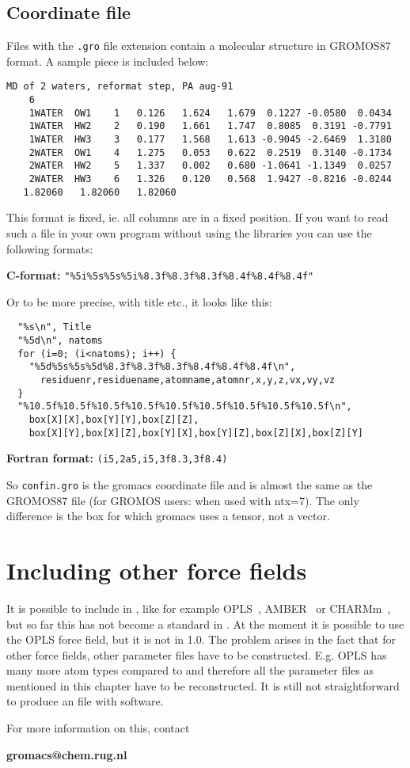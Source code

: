 \subsection{Coordinate file}
\label{subsec:grofile}
Files with the {\tt .gro} file extension contain a molecular structure in 
GROMOS87 format. A sample piece is included below:
{\small\begin{verbatim}
MD of 2 waters, reformat step, PA aug-91
    6
    1WATER  OW1    1   0.126   1.624   1.679  0.1227 -0.0580  0.0434
    1WATER  HW2    2   0.190   1.661   1.747  0.8085  0.3191 -0.7791
    1WATER  HW3    3   0.177   1.568   1.613 -0.9045 -2.6469  1.3180
    2WATER  OW1    4   1.275   0.053   0.622  0.2519  0.3140 -0.1734
    2WATER  HW2    5   1.337   0.002   0.680 -1.0641 -1.1349  0.0257
    2WATER  HW3    6   1.326   0.120   0.568  1.9427 -0.8216 -0.0244
   1.82060   1.82060   1.82060
\end{verbatim}}
This format is fixed, ie. all columns are in a fixed position. If you
want to read such a file in your own program without using the
{\gromacs} libraries you can use the following formats:

{\bf C-format:} \verb'"%5i%5s%5s%5i%8.3f%8.3f%8.3f%8.4f%8.4f%8.4f"'

Or to be more precise, with title etc., it looks like this:
\begin{verbatim}
  "%s\n", Title
  "%5d\n", natoms
  for (i=0; (i<natoms); i++) {
    "%5d%5s%5s%5d%8.3f%8.3f%8.3f%8.4f%8.4f%8.4f\n",
      residuenr,residuename,atomname,atomnr,x,y,z,vx,vy,vz
  }
  "%10.5f%10.5f%10.5f%10.5f%10.5f%10.5f%10.5f%10.5f%10.5f\n",
    box[X][X],box[Y][Y],box[Z][Z],
    box[X][Y],box[X][Z],box[Y][X],box[Y][Z],box[Z][X],box[Z][Y]
\end{verbatim}

{\bf Fortran format:} \verb'(i5,2a5,i5,3f8.3,3f8.4)'

So \verb'confin.gro' is the gromacs coordinate file and is almost the
same as the GROMOS87 file (for GROMOS users: when used with
ntx=7). The only difference is the box for which gromacs uses a
tensor, not a vector.

\section{Including other force fields}
\label{sec:otherff}
It is possible to include  
in {\gromacs}, like for
example OPLS~\cite{Jorgensen88}, AMBER~\cite{Weiner86} or 
CHARMm~\cite{BBrooks83},
but so far this has not become a standard in {\gromacs}. At the moment
it is possible to use the OPLS force field, but it is not in {\gromacs}
1.0. The problem arises in the fact that for other force fields, other
parameter files have to be constructed. E.g. OPLS has many more atom
types compared to {\gromacs} and therefore all the parameter files as
mentioned in this chapter have to be reconstructed. It is still not
straightforward to produce an  file with {\gromacs}
software. 

For more information on this, contact

{\bf gromacs@chem.rug.nl}


